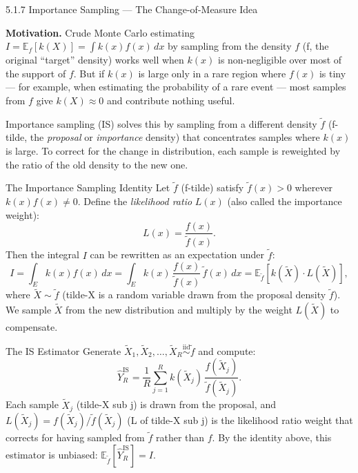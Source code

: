\documentclass[aspectratio=169,10pt]{beamer}
\begin{document}
\begin{frame}[allowframebreaks]{5.1.7 Importance Sampling --- The Change-of-Measure Idea}

\textbf{Motivation.}
Crude Monte Carlo estimating $I = \mathbb{E}_f[k(X)] = \int k(x)f(x)\,dx$
by sampling from the density $f$ (f, the original ``target'' density) works
well when $k(x)$ is non-negligible over most of the support of $f$.
But if $k(x)$ is large only in a rare region where $f(x)$ is tiny --- for
example, when estimating the probability of a rare event --- most samples from
$f$ give $k(X) \approx 0$ and contribute nothing useful.

Importance sampling (IS) solves this by sampling from a different density
$\tilde{f}$ (f-tilde, the \emph{proposal} or \emph{importance} density)
that concentrates samples where $k(x)$ is large.
To correct for the change in distribution, each sample is reweighted by
the ratio of the old density to the new one.

\begin{block}{The Importance Sampling Identity}
  Let $\tilde{f}$ (f-tilde) satisfy $\tilde{f}(x) > 0$ wherever $k(x)f(x) \ne 0$.
  Define the \emph{likelihood ratio} $L(x)$ (also called the importance weight):
  \[
    L(x) = \frac{f(x)}{\tilde{f}(x)}.
  \]
  Then the integral $I$ can be rewritten as an expectation under $\tilde{f}$:
  \[
    I = \int_E k(x)f(x)\,dx
      = \int_E k(x)\,\frac{f(x)}{\tilde{f}(x)}\,\tilde{f}(x)\,dx
      = \mathbb{E}_{\tilde{f}}\!\left[k(\tilde{X})\cdot L(\tilde{X})\right],
  \]
  where $\tilde{X} \sim \tilde{f}$ (tilde-X is a random variable drawn from
  the proposal density $\tilde{f}$).  We sample $\tilde{X}$ from the new
  distribution and multiply by the weight $L(\tilde{X})$ to compensate.
\end{block}

\framebreak

\begin{block}{The IS Estimator}
  Generate $\tilde{X}_1, \tilde{X}_2, \ldots, \tilde{X}_R
  \overset{\mathrm{iid}}{\sim} \tilde{f}$ and compute:
  \[
    \hat{Y}_R^{\mathrm{IS}} = \frac{1}{R}\sum_{j=1}^R
    k(\tilde{X}_j)\,\frac{f(\tilde{X}_j)}{\tilde{f}(\tilde{X}_j)}.
  \]
  Each sample $\tilde{X}_j$ (tilde-X sub j) is drawn from the proposal,
  and $L(\tilde{X}_j) = f(\tilde{X}_j)/\tilde{f}(\tilde{X}_j)$ (L of tilde-X sub j)
  is the likelihood ratio weight that corrects for having sampled from $\tilde{f}$
  rather than $f$.  By the identity above, this estimator is unbiased:
  $\mathbb{E}_{\tilde{f}}[\hat{Y}_R^{\mathrm{IS}}] = I$.
\end{block}


\end{frame}
\end{document}
